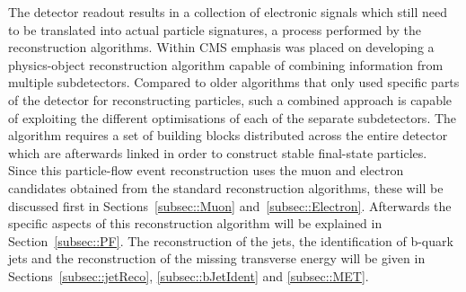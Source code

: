 The detector readout results in a collection of electronic signals which still need to be translated into actual particle signatures, a process performed by the reconstruction algorithms.
Within CMS emphasis was placed on developing a physics-object reconstruction algorithm capable of combining information from multiple subdetectors. 
Compared to older algorithms that only used specific parts of the detector for reconstructing particles, such a combined approach is capable of exploiting the different optimisations of each of the separate subdetectors.
The algorithm requires a set of building blocks distributed across the entire detector which are afterwards linked in order to construct stable final-state particles.
\\
Since this particle-flow event reconstruction uses the muon and electron candidates obtained from the standard reconstruction algorithms, these will be discussed first in Sections~\ref{subsec::Muon} and~\ref{subsec::Electron}.
Afterwards the specific aspects of this reconstruction algorithm will be explained in Section~\ref{subsec::PF}.
The reconstruction of the jets, the identification of b-quark jets and the reconstruction of the missing transverse energy will be given in Sections~\ref{subsec::jetReco}, \ref{subsec::bJetIdent} and \ref{subsec::MET}.

